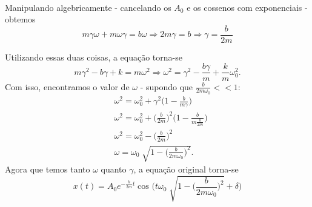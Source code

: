 \documentclass[physicsII_notes.tex]{subfiles}
\begin{document}
\paragraph{}  Manipulando algebricamente - cancelando os \(A_{0}\) e os cossenos com exponenciais - obtemos
\[
	m\gamma \omega  + m\omega \gamma  = b\omega \Rightarrow 2m\gamma  = b \Rightarrow \gamma = \frac{b}{2m}
\]

Utilizando essas duas coisas, a equação torna-se
\[
	m\gamma ^{2} - b\gamma + k = m\omega ^{2} \Rightarrow \omega ^{2} = \gamma ^{2}-\frac{b\gamma }{m}+\frac{k}{m}\omega_{0}^{2}.
\]
Com isso, encontramos o valor de \(\omega\) - supondo que \(\frac{b}{2m\omega_{0}} <<1\):
\begin{align*}
	 & \omega ^{2} = \omega_{0}^{2} + \gamma ^{2}\biggl(1 - \frac{b}{m\gamma }\biggr)                        \\
	 & \omega ^{2} = \omega_{0}^{2} + \biggl(\frac{b}{2m}\biggr)^{2}\biggl(1-\frac{b}{m \frac{b}{2m}}\biggr) \\
	 & \omega ^{2} = \omega_{0}^{2} - \biggl(\frac{b}{2m}\biggr)^{2}                                         \\
	 & \omega  = \omega_{0}\sqrt[]{1-\biggl(\frac{b}{2m\omega_{0}}\biggr)^{2}}.
\end{align*}
Agora que temos tanto \(\omega \) quanto \(\gamma \), a equação original torna-se
\[
	\boxed{x(t) = A_{0}e^{-\frac{b}{2m}t}\cos^{}{\biggl(t\omega_{0}\sqrt[]{1-\biggl(\frac{b}{2m\omega_{0}}\biggr)^{2}}+\delta \biggr)}}
\]
\end{document}
